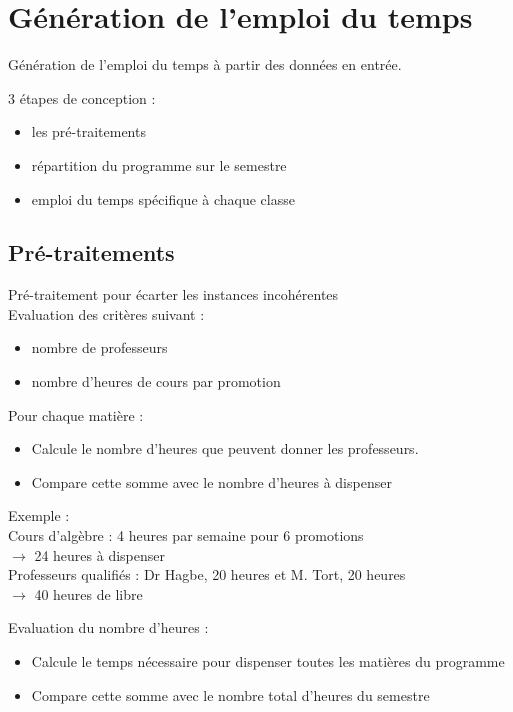 \documentclass{beamer}
\begin{document}
\section{Génération de l'emploi du temps}
\begin {frame}
Génération de l'emploi du temps à partir des données en entrée.

3 étapes de conception : 
\begin{itemize}
\item les pré-traitements
\item répartition du programme sur le semestre
\item emploi du temps spécifique à chaque classe
\end{itemize}
\end{frame}

\subsection{Pré-traitements}
\begin{frame}
Pré-traitement pour écarter les instances incohérentes\\
\vspace{\baselineskip}
Evaluation des critères suivant :
\begin {itemize}
\item nombre de professeurs
\item nombre d'heures de cours par promotion
\end{itemize}
\end{frame}

\begin{frame}
Pour chaque matière :
\begin{itemize}
\item Calcule le nombre d'heures que peuvent donner les professeurs.
\item Compare cette somme avec le nombre d'heures à dispenser
\end{itemize}
\vspace{\baselineskip}
Exemple :\\
Cours d'algèbre : 4 heures par semaine pour 6 promotions\\ 
$\rightarrow$ 24 heures à dispenser\\
Professeurs qualifiés : Dr Hagbe, 20 heures et M. Tort, 20 heures\\
$\rightarrow$ 40 heures de libre\\
\end{frame}

\begin{frame}
Evaluation du nombre d'heures :\\
\begin{itemize}
\item Calcule le temps nécessaire pour dispenser toutes les matières du programme
\item Compare cette somme avec le nombre total d'heures du semestre
\end{itemize}
\end{frame}
\end{document}
